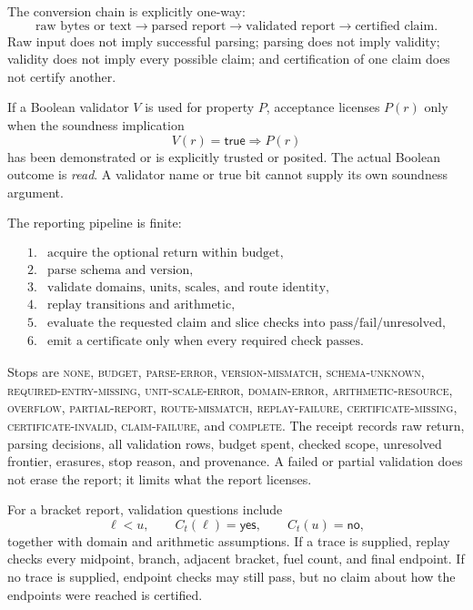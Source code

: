 The conversion chain is explicitly one-way:
\[
 \text{raw bytes or text}\longrightarrow\text{parsed report}
 \longrightarrow\text{validated report}\longrightarrow\text{certified claim}.
\]
Raw input does not imply successful parsing; parsing does not imply validity; validity does not imply every possible
claim; and certification of one claim does not certify another.

If a Boolean validator \(V\) is used for property \(P\), acceptance licenses \(P(r)\) only when the soundness
implication
\[
                         V(r)=\mathsf{true}\Longrightarrow P(r)
\]
has been demonstrated or is explicitly trusted or posited.  The actual Boolean outcome is \emph{read}.  A validator
name or true bit cannot supply its own soundness argument.

The reporting pipeline is finite:

\[
\begin{array}{ll}
1.&\text{acquire the optional return within budget},\\
2.&\text{parse schema and version},\\
3.&\text{validate domains, units, scales, and route identity},\\
4.&\text{replay transitions and arithmetic},\\
5.&\text{evaluate the requested claim and slice checks into pass/fail/unresolved},\\
6.&\text{emit a certificate only when every required check passes.}
\end{array}
\]

Stops are \textsc{none}, \textsc{budget}, \textsc{parse-error}, \textsc{version-mismatch},
\textsc{schema-unknown}, \textsc{required-entry-missing}, \textsc{unit-scale-error},
\textsc{domain-error}, \textsc{arithmetic-resource}, \textsc{overflow},
\textsc{partial-report}, \textsc{route-mismatch}, \textsc{replay-failure},
\textsc{certificate-missing}, \textsc{certificate-invalid}, \textsc{claim-failure}, and \textsc{complete}.  The receipt records raw
return, parsing decisions, all validation rows, budget spent, checked scope, unresolved frontier, erasures, stop reason, and provenance.
A failed or partial validation does not erase the report; it limits what the report licenses.

For a bracket report, validation questions include
\[
 \ell<u,\qquad C_t(\ell)=\mathsf{yes},\qquad C_t(u)=\mathsf{no},
\]
together with domain and arithmetic assumptions.  If a trace is supplied, replay checks every midpoint, branch,
adjacent bracket, fuel count, and final endpoint.  If no trace is supplied, endpoint checks may still pass, but no claim
about how the endpoints were reached is certified.

